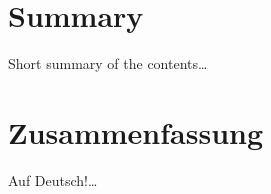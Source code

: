 

\begingroup
\let\clearpage\relax
\let\cleardoublepage\relax
\let\cleardoublepage\relax

\chapter*{Summary} %

Short summary of the contents\dots

\cleardoublepage

\chapter*{Zusammenfassung} %

Auf Deutsch!\ldots

\endgroup			

\vfill